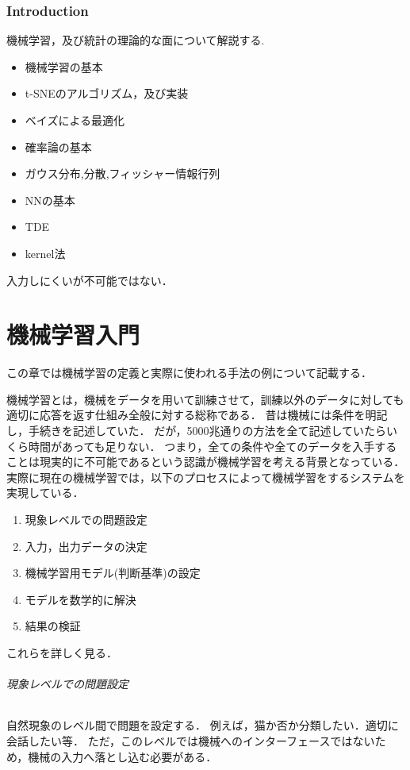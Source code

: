 \documentclass{ujarticle}
\begin{document}
\section{Introduction}
\label{sec:Introduction}
機械学習，及び統計の理論的な面について解説する.

\begin{itemize}
  \item 機械学習の基本
  \item t-SNEのアルゴリズム，及び実装
  \item ベイズによる最適化
  \item 確率論の基本
  \item ガウス分布,分散,フィッシャー情報行列
  \item NNの基本
  \item TDE
  \item kernel法
\end{itemize}
入力しにくいが不可能ではない．


\part{機械学習入門}
この章では機械学習の定義と実際に使われる手法の例について記載する．

機械学習とは，機械をデータを用いて訓練させて，訓練以外のデータに対しても適切に応答を返す仕組み全般に対する総称である．
昔は機械には条件を明記し，手続きを記述していた．
だが，5000兆通りの方法を全て記述していたらいくら時間があっても足りない．
つまり，全ての条件や全てのデータを入手することは現実的に不可能であるという認識が機械学習を考える背景となっている．
実際に現在の機械学習では，以下のプロセスによって機械学習をするシステムを実現している．
\begin{enumerate}
  \item 現象レベルでの問題設定
  \item 入力，出力データの決定
  \item 機械学習用モデル(判断基準)の設定
  \item モデルを数学的に解決
  \item 結果の検証
\end{enumerate}
これらを詳しく見る．
　
\paragraph{現象レベルでの問題設定}
自然現象のレベル間で問題を設定する．
例えば，猫か否か分類したい．適切に会話したい等．
ただ，このレベルでは機械へのインターフェースではないため，機械の入力へ落とし込む必要がある．
\end{document}

